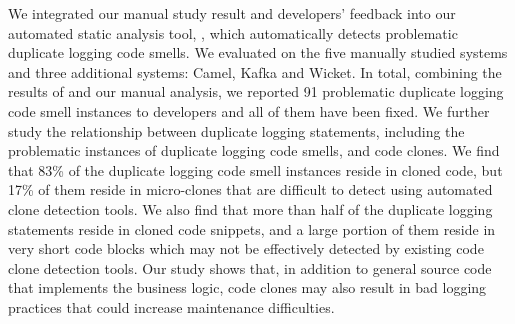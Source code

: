 We integrated our manual study result and developers' feedback into our automated static analysis tool, \tool, which automatically detects problematic duplicate logging code smells. We evaluated \toolS on the five manually studied systems and three additional systems: Camel, Kafka and Wicket. In total, combining the results of \toolS and our manual analysis, we reported 91 problematic duplicate logging code smell instances to developers and all of them have been fixed. We further study the relationship between duplicate logging statements, including the problematic instances of duplicate logging code smells, and code clones. We find that 83\% of the duplicate logging code smell instances reside in cloned code, but 17\% of them reside in micro-clones that are difficult to detect using automated clone detection tools. We also find that more than half of the duplicate logging statements reside in cloned code snippets, and a large portion of them reside in very short code blocks which may not be effectively detected by existing code clone detection tools. Our study shows that, in addition to general source code that implements the business logic, code clones may also result in bad logging practices that could increase maintenance difficulties. %








